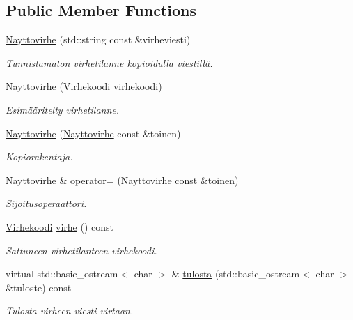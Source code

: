 \subsection*{Public Member Functions}
\begin{DoxyCompactItemize}
\item 
\hyperlink{class_julkinen_1_1_nayttovirhe_a7e86d0fcc83269a4cfc34d487498e904}{Nayttovirhe} (std\+::string const \&virheviesti)
\begin{DoxyCompactList}\small\item\em Tunnistamaton virhetilanne kopioidulla viestillä. \end{DoxyCompactList}\item 
\hyperlink{class_julkinen_1_1_nayttovirhe_a02d21e4b5ddfdff5890742d05a0e81b7}{Nayttovirhe} (\hyperlink{class_julkinen_1_1_nayttovirhe_a13d43d49006dab024b0d3ac20a9fb8fa}{Virhekoodi} virhekoodi)
\begin{DoxyCompactList}\small\item\em Esimääritelty virhetilanne. \end{DoxyCompactList}\item 
\hyperlink{class_julkinen_1_1_nayttovirhe_a7765c49657111506d7b25a1720b21640}{Nayttovirhe} (\hyperlink{class_julkinen_1_1_nayttovirhe}{Nayttovirhe} const \&toinen)
\begin{DoxyCompactList}\small\item\em Kopiorakentaja. \end{DoxyCompactList}\item 
\hyperlink{class_julkinen_1_1_nayttovirhe}{Nayttovirhe} \& \hyperlink{class_julkinen_1_1_nayttovirhe_a3ced8ea4fdc6e72da15f6f480057c613}{operator=} (\hyperlink{class_julkinen_1_1_nayttovirhe}{Nayttovirhe} const \&toinen)
\begin{DoxyCompactList}\small\item\em Sijoitusoperaattori. \end{DoxyCompactList}\item 
\hyperlink{class_julkinen_1_1_nayttovirhe_a13d43d49006dab024b0d3ac20a9fb8fa}{Virhekoodi} \hyperlink{class_julkinen_1_1_nayttovirhe_a5ca5953148a213a4ffd79c191b0ab651}{virhe} () const 
\begin{DoxyCompactList}\small\item\em Sattuneen virhetilanteen virhekoodi. \end{DoxyCompactList}\item 
virtual std\+::basic\+\_\+ostream$<$ char $>$ \& \hyperlink{class_julkinen_1_1_nayttovirhe_ae8e4d0a5f98c3f61afc72dfed2af967f}{tulosta} (std\+::basic\+\_\+ostream$<$ char $>$ \&tuloste) const 
\begin{DoxyCompactList}\small\item\em Tulosta virheen viesti virtaan. \end{DoxyCompactList}\end{DoxyCompactItemize}
